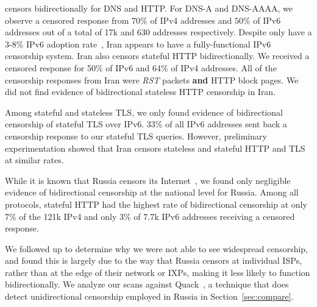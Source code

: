 

censors bidirectionally for DNS and HTTP. For DNS-A and DNS-AAAA, we observe a
censored response from $70\%$ of IPv4 addresses and $50\%$ of IPv6 addresses out
of a total of 17k and 630 addresses respectively. Despite only have a 3-8\% IPv6
adoption rate~\cite{akamai-ipv6,Google-IPv6}, Iran appears to have a
fully-functional IPv6
censorship system. Iran also censors stateful
HTTP bidirectionally. We received a censored response for 50\% of IPv6 and 64\%
of IPv4 addresses. All of the censorship responses from Iran were \textit{RST}
packets \textbf{and} HTTP block pages. We did not find evidence of bidirectional
stateless HTTP censorship in Iran.

Among stateful and stateless TLS, we only found evidence of bidirectional censorship of stateful TLS over IPv6. 33\% of all IPv6 addresses sent back a censorship response to our stateful TLS queries. However, preliminary experimentation showed that Iran censors stateless and stateful HTTP and TLS at similar rates. %


While it is known that Russia censors its
Internet~\cite{ramesh2020decentralized}, we found only negligible evidence of
bidirectional censorship at the national level for Russia. Among all protocols,
stateful HTTP had the highest rate of bidirectional censorship at only 7\% of
the 121k IPv4 and only 3\% of 7.7k IPv6 addresses receiving a censored response.

We followed up to determine why we were not able to see widespread censorship,
and found this is largely due to the way that Russia censors at individual ISPs,
rather than at the edge of their network or IXPs, making it less likely to
function bidirectionally. We analyze our scans against
Quack~\cite{vandersloot2018quack}, a technique that does
detect unidirectional censorship employed in Russia in
Section~\ref{sec:compare}.

